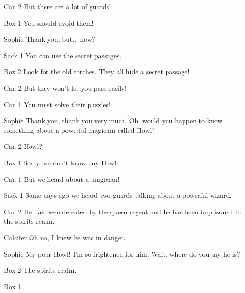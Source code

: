 \begin{screenplay}
\begin{dialogue}{Can 2}
But there are a lot of guards!
\end{dialogue}
\begin{dialogue}{Box 1}
You should avoid them!
\end{dialogue}
\begin{dialogue}{Sophie}
Thank you, but... how?
\end{dialogue}
\begin{dialogue}{Sack 1}
You can use the secret passages.
\end{dialogue}
\begin{dialogue}{Box 2}
Look for the old torches. They all hide a secret passage!
\end{dialogue}
\begin{dialogue}{Can 2}
But they won't let you pass easily!
\end{dialogue}
\begin{dialogue}{Can 1}
You must solve their puzzles!
\end{dialogue}
\begin{dialogue}[grateful]{Sophie}
Thank you, thank you very much. Oh, would you happen to know something about a powerful magician called Howl?
\end{dialogue}
\begin{dialogue}{Can 2}
Howl?
\end{dialogue}
\begin{dialogue}{Box 1}
Sorry, we don’t know any Howl.
\end{dialogue}
\begin{dialogue}{Can 1}
But we heard about a magician!
\end{dialogue}
\begin{dialogue}{Sack 1}
Some days ago we heard two guards talking about a powerful wizard.
\end{dialogue}
\begin{dialogue}{Can 2}
He has been defeated by the queen regent and he has been imprisoned in the spirits realm.
\end{dialogue}
\begin{dialogue}{Calcifer}
Oh no, I knew he was in danger.
\end{dialogue}
\begin{dialogue}{Sophie}
My poor Howl! I’m so frightened for him. Wait, where do you say he is?
\end{dialogue}
\begin{dialogue}{Box 2}
The spirits realm.
\end{dialogue}
\begin{dialogue}{Box 1}

\end{dialogue}
\end{screenplay}
